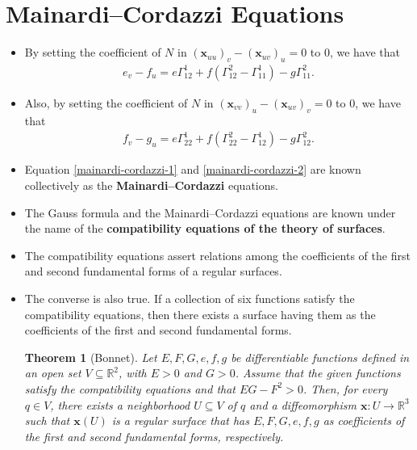 \documentclass[10pt]{article}
\newtheorem{theorem}[lemma]{Theorem}
\newcommand{\ve}[1]{\mathbf{#1}}
\newcommand{\ra}{\rightarrow}
\newcommand{\Real}{\mathbb{R}}
\newcommand{\sseq}{\subseteq}
\begin{document}
  \section{Mainardi--Cordazzi Equations}
  \begin{itemize}
    \item By setting the coefficient of $N$ in $(\ve{x}_{uu})_v - (\ve{x}_{uv})_u = 0$ to 0, we have that
    \begin{align} \label{mainardi-cordazzi-1}
      e_v - f_u = e\Gamma_{12}^1 + f(\Gamma_{12}^2 - \Gamma_{11}^1) - g \Gamma_{11}^2.
    \end{align}

    \item Also, by setting the coefficient of $N$ in $(\ve{x}_{vv})_u - (\ve{x}_{uv})_v = 0$ to 0, we have that
    \begin{align} \label{mainardi-cordazzi-2}
      f_v - g_u = e\Gamma_{22}^1 + f(\Gamma_{22}^2-\Gamma_{12}^1) - g\Gamma_{12}^2.
    \end{align}

    \item Equation \eqref{mainardi-cordazzi-1} and \eqref{mainardi-cordazzi-2} are known collectively as the {\bf Mainardi--Cordazzi} equations.

    \item The Gauss formula and the Mainardi--Cordazzi equations are known under the name of the {\bf compatibility equations of the theory of surfaces}.

    \item The compatibility equations assert relations among the coefficients of the first and second fundamental forms of a regular surfaces.  

    \item The converse is also true. If a collection of six functions satisfy the compatibility equations, then there exists a surface having them as the coefficients of the first and second fundamental forms.

    \begin{theorem}[Bonnet]
      Let $E, F, G, e, f, g$ be differentiable functions defined in an open set $V \sseq \Real^2$, with $E > 0$ and $G > 0$. Assume that the given functions satisfy the compatibility equations and that $EG - F^2 > 0$. Then, for every $q \in V$, there exists a neighborhood $U \sseq V$ of $q$ and a diffeomorphism $\ve{x} : U \ra \Real^3$ such that $\ve{x}(U)$ is a regular surface that has $E, F, G, e, f, g$ as coefficients of the first and second fundamental forms, respectively.


\end{theorem}
\end{itemize}
\end{document}
